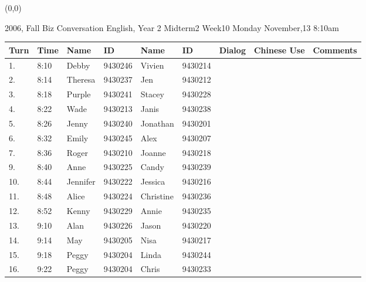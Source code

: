 \documentclass[a4paper]{article}
\begin{document}
\begin{textblock}{15}(0,0)
\begin{minipage}{20cm}
\Large
\begin{Large}2006, Fall Biz Conversation English, Year 2 Midterm2 Week10 Monday November,13 8:10am\end{Large}
\par
\begin{tabular}[t]{|p{0.5cm}|p{0.8cm}|p{2.1cm}|p{2.1cm}|p{2.1cm}|p{2.1cm}|p{0.9cm}|p{3.0cm}|p{2.5cm}|}
\hline
 Turn & Time & Name & ID & Name & ID & Dialog & Chinese Use & Comments \\ \hline
\hline

1. &8:10& Debby	&9430246& Vivien	&9430214& & & \\ \hline
2. &8:14& Theresa	&9430237& Jen	&9430212& & & \\ \hline
3. &8:18& Purple	&9430241& Stacey	&9430228& & & \\ \hline
4. &8:22& Wade	&9430213& Janis	&9430238& & & \\ \hline
5. &8:26& Jenny	&9430240& Jonathan	&9430201& & & \\ \hline
6. &8:32& Emily	&9430245& Alex	&9430207& & & \\ \hline
7. &8:36& Roger	&9430210& Joanne	&9430218& & & \\ \hline
9. &8:40& Anne	&9430225& Candy	&9430239& & & \\ \hline
10.&8:44& Jennifer	&9430222& Jessica	&9430216& & & \\ \hline
11.&8:48& Alice	&9430224& Christine	&9430236& & & \\ \hline
12.&8:52& Kenny	&9430229& Annie	&9430235& & & \\ \hline
13.&9:10& Alan	&9430226& Jason	&9430220& & & \\ \hline
14.&9:14& May	&9430205& Nisa	&9430217& & & \\ \hline
15.&9:18& Peggy	&9430204& Linda	&9430244& & & \\ \hline
16.&9:22& Peggy	&9430204& Chris	&9430233& & & \\ \hline
\hline
\end{tabular}
\end{minipage}
\end{textblock}
\end{document}
